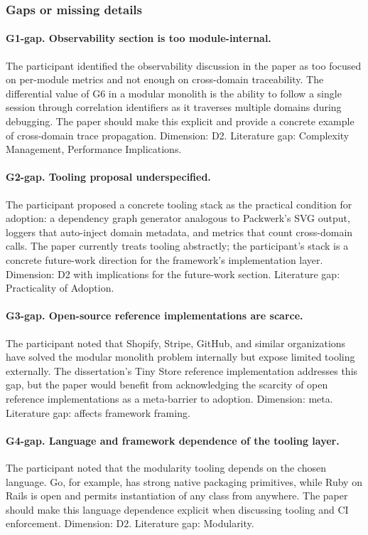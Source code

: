 \subsubsection*{Gaps or missing details}

\paragraph*{G1-gap. Observability section is too module-internal.} The participant identified the observability discussion in the paper as too focused on per-module metrics and not enough on cross-domain traceability. The differential value of G6 in a modular monolith is the ability to follow a single session through correlation identifiers as it traverses multiple domains during debugging. The paper should make this explicit and provide a concrete example of cross-domain trace propagation. Dimension: D2. Literature gap: Complexity Management, Performance Implications.

\paragraph*{G2-gap. Tooling proposal underspecified.} The participant proposed a concrete tooling stack as the practical condition for adoption: a dependency graph generator analogous to Packwerk's SVG output, loggers that auto-inject domain metadata, and metrics that count cross-domain calls. The paper currently treats tooling abstractly; the participant's stack is a concrete future-work direction for the framework's implementation layer. Dimension: D2 with implications for the future-work section. Literature gap: Practicality of Adoption.

\paragraph*{G3-gap. Open-source reference implementations are scarce.} The participant noted that Shopify, Stripe, GitHub, and similar organizations have solved the modular monolith problem internally but expose limited tooling externally. The dissertation's Tiny Store reference implementation addresses this gap, but the paper would benefit from acknowledging the scarcity of open reference implementations as a meta-barrier to adoption. Dimension: meta. Literature gap: affects framework framing.

\paragraph*{G4-gap. Language and framework dependence of the tooling layer.} The participant noted that the modularity tooling depends on the chosen language. Go, for example, has strong native packaging primitives, while Ruby on Rails is open and permits instantiation of any class from anywhere. The paper should make this language dependence explicit when discussing tooling and CI enforcement. Dimension: D2. Literature gap: Modularity.

